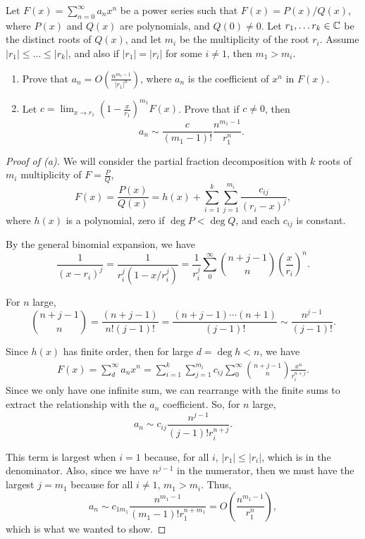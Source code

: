 \documentclass[../hw2]{subfiles}
\begin{document}
\begin{problem}
Let $F(x)=\sum_{n=0}^{\infty} a_n x^n$ be a power series such that $F(x)=P(x) / Q(x)$, where $P(x)$ and $Q(x)$ are polynomials, and $Q(0)\neq 0$.
Let $r_1,\ldots r_k \in \mathbb{C}$ be the distinct roots of $Q(x)$,  and let $m_i$ be the multiplicity of the root  $r_i$.
Assume  $|r_1|\le \ldots\le |r_k|$, and also if $|r_1| = |r_i|$ for some  $i\neq 1$, then $m_1>m_i$.
\begin{enumerate}[label=(\alph*)]
	\item Prove that $a_n=O\left( \frac{n^{m_1-1}}{|r_1|^n} \right) $, where $a_n$ is the coefficient of  $x^n$ in  $F(x)$.
	\item Let $c=\lim_{x \to r_1} \left( 1-\frac{x}{r_1} \right)^{m_1} F(x)$.
	      Prove that if $c\neq 0$, then \[
		      a_n \sim \frac{c}{(m_1-1)!}\frac{n^{m_1-1}}{r_1^n}
		      .\]
\end{enumerate}
\end{problem}
\begin{proof}[Proof of (a)]
	We will consider the partial fraction decomposition with $k$ roots of $m_i$ multiplicity of $F = \frac{P}{Q}$, \[
		F(x) = \frac{P(x)}{Q(x)} = h(x)+\sum_{i=1}^{k} \sum_{j=1}^{m_i} \frac{c_{ij}}{(r_i-x)^j}
		,\] where $h(x)$ is a polynomial, zero if $\deg{P} < \deg{Q}$, and each $c_{ij}$ is constant.

	By the general binomial expansion, we have \[
		\frac{1}{(x-r_i)^j} = \frac{1}{r_i^j(1- x / r_i^j)} = \frac{1}{r_i^j}\sum_{0}^{\infty} \binom{n+j-1}{n} \left( \frac{x}{r_i} \right)^n
		.\]

	For $n$ large, \[
		\binom{n+j-1}{n} = \frac{(n+j-1)}{n!(j-1)!}=\frac{(n+j-1)\cdots(n+1)}{(j-1)!}\sim \frac{n^{j-1}}{(j-1)!}
		.\]

	Since $h(x)$ has finite order, then for large $d=\deg{h}<n$, we have
	\begin{align*}
		F(x)=\sum_{d}^{\infty} a_n x^n = \sum_{i=1}^{k} \sum_{j=1}^{m_i} c_{ij} \sum_{0}^{\infty} \binom{n+j-1}{n} \frac{x^n}{r_i^{n+j}}
		.\end{align*}
	Since we only have one infinite sum, we can rearrange with the finite sums to extract the relationship with the $a_n$ coefficient.
	So, for $n$ large, \[
		a_n \sim c_{ij}\frac{n^{j-1}}{(j-1)!r_i^{n+j}}
		.\]

	This term is largest when $i=1$ because, for all $i$, $|r_1|\le |r_i|$, which is in the denominator.
	Also, since we have $n^{j-1}$ in the numerator, then we must have the largest $j=m_1$ because for all $i\neq 1$, $m_1 > m_i$.
	Thus, \[
		a_n \sim c_{1m_1}\frac{n^{m_1-1}}{(m_1-1)!r_1^{n+m_1}} = O\left( \frac{n^{m_1-1}}{r_1^n} \right)
		,\] which is what we wanted to show.
\end{proof}
\end{document}
